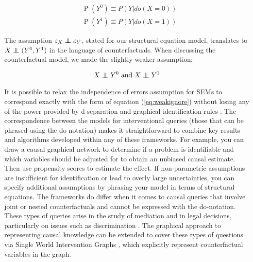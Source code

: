 \documentclass[11pt,a4paper,twoside]{report}
\renewcommand{\P}[1]{\operatorname{P}\left(#1\right)}
\theoremstyle{plain}
\theoremstyle{definition}
\let\epsilon\varepsilon
\newcommand{\ci}{\mathrel{\perp\mspace{-10mu}\perp}}
\begin{document}
\begin{equation}
\begin{aligned}
&\P{Y^{0}} \equiv P(Y|do(X=0)) \\
&\P{Y^{1}} \equiv P(Y|do(X=1))
\end{aligned}
\end{equation}

The assumption $\epsilon_{X} \ci \epsilon_{Y}$, stated for our structural equation model, translates to $X \ci (Y^{0},Y^{1})$ in the language of counterfactuals. When discussing the counterfactual model, we made the slightly weaker assumption:

\begin{equation}
\label{eq:weakignore}
X \ci Y^{0} \text{ and } X \ci Y^{1}
\end{equation}

It is possible to relax the independence of errors assumption for SEMs to correspond exactly with the form of equation (\ref{eq:weakignore}) without losing any of the power provided by d-separation and graphical identification rules \citep{Richardson2013}. The correspondence between the models for interventional queries (those that can be phrased using the do-notation) makes it straightforward to combine key results and algorithms developed within any of these frameworks. For example, you can draw a causal graphical network to determine if a problem is identifiable and which variables should be adjusted for to obtain an unbiased causal estimate. Then use propensity scores \citep{Rosenbaum1983} to estimate the effect. If non-parametric assumptions are insufficient for identification or lead to overly large uncertainties, you can specify additional assumptions by phrasing your model in terms of structural equations. The frameworks do differ when it comes to causal queries that involve joint or nested counterfactuals and cannot be expressed with the do-notation. These types of queries arise in the study of mediation \citep{Pearl2014,Imai2010a,VanderWeele2011} and in legal decisions, particularly on issues such as discrimination \citep{Pearl2000}. The graphical approach to representing causal knowledge can be extended to cover these types of questions via Single World Intervention Graphs \citep{Richardson2013}, which explicitly represent counterfactual variables in the graph. 
\end{document}
